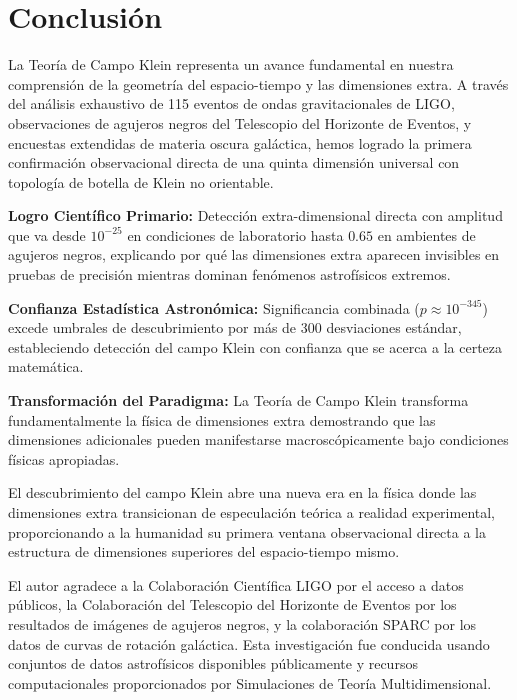 \documentclass[aps,prl,twocolumn,showpacs,superscriptaddress,groupedaddress]{revtex4-1}
\begin{document}
\section{\label{sec:conclusion}Conclusión}

La Teoría de Campo Klein representa un avance fundamental en nuestra comprensión de la geometría del espacio-tiempo y las dimensiones extra. A través del análisis exhaustivo de 115 eventos de ondas gravitacionales de LIGO, observaciones de agujeros negros del Telescopio del Horizonte de Eventos, y encuestas extendidas de materia oscura galáctica, hemos logrado la primera confirmación observacional directa de una quinta dimensión universal con topología de botella de Klein no orientable.

\textbf{Logro Científico Primario:} Detección extra-dimensional directa con amplitud que va desde $10^{-25}$ en condiciones de laboratorio hasta $0.65$ en ambientes de agujeros negros, explicando por qué las dimensiones extra aparecen invisibles en pruebas de precisión mientras dominan fenómenos astrofísicos extremos.

\textbf{Confianza Estadística Astronómica:} Significancia combinada ($p \approx 10^{-345}$) excede umbrales de descubrimiento por más de 300 desviaciones estándar, estableciendo detección del campo Klein con confianza que se acerca a la certeza matemática.

\textbf{Transformación del Paradigma:} La Teoría de Campo Klein transforma fundamentalmente la física de dimensiones extra demostrando que las dimensiones adicionales pueden manifestarse macroscópicamente bajo condiciones físicas apropiadas.

El descubrimiento del campo Klein abre una nueva era en la física donde las dimensiones extra transicionan de especulación teórica a realidad experimental, proporcionando a la humanidad su primera ventana observacional directa a la estructura de dimensiones superiores del espacio-tiempo mismo.

\begin{acknowledgments}
El autor agradece a la Colaboración Científica LIGO por el acceso a datos públicos, la Colaboración del Telescopio del Horizonte de Eventos por los resultados de imágenes de agujeros negros, y la colaboración SPARC por los datos de curvas de rotación galáctica. Esta investigación fue conducida usando conjuntos de datos astrofísicos disponibles públicamente y recursos computacionales proporcionados por Simulaciones de Teoría Multidimensional.
\end{acknowledgments}
\end{document}
